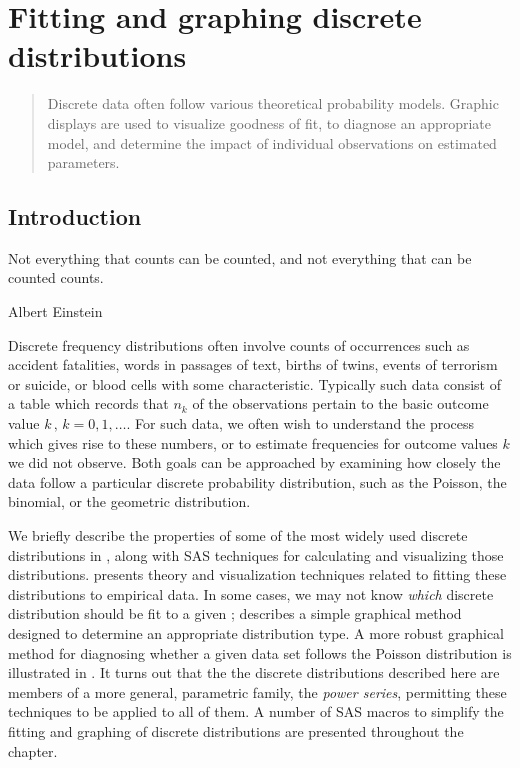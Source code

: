 \chapter{Fitting and graphing discrete distributions}\label{ch:discrete}

\begin{quote}
{\Large
Discrete data often follow various theoretical probability models.
Graphic displays are used to visualize goodness of fit,
to diagnose an appropriate model, and determine the impact of
individual observations on estimated parameters.
}
\end{quote}
\minitoc
\clearpage

\section{Introduction}
\epigraph{Not everything that counts can be counted, and not everything that
can be counted counts.}
{Albert Einstein}
Discrete frequency distributions often involve counts of occurrences
such as accident fatalities, words in passages of text,  births of twins,
events of terrorism or suicide, or blood
cells with some characteristic.  Typically such data consist of a
table which records that \(n_k\) of the observations pertain to the
basic outcome value \(k \,  , \,  k = 0 , 1, \dots\).
For such data, we often wish to understand the process which gives rise to
these numbers, or to estimate frequencies for outcome values $k$ we
did not observe.  Both goals can be approached by examining
how closely the data follow a particular discrete probability distribution, such as the Poisson, the binomial, or the geometric distribution.

We briefly describe the properties of some of the most widely used
discrete distributions in , along with
SAS techniques for calculating and visualizing those distributions.
 presents theory and visualization techniques
related to fitting these distributions to empirical data.
In some cases, we may not know \emph{which} discrete distribution
should be fit to a given \Dset;  
describes a simple graphical method designed to determine an appropriate
distribution type.
A more robust graphical method for diagnosing whether a given data
set follows the Poisson distribution is illustrated in .
It turns out that the the discrete distributions described here
are members of a more general, parametric family, the \emph{power series},
permitting these
techniques to be applied to all of them.
A number of SAS macros to simplify the fitting and graphing of discrete
distributions are presented throughout the chapter.
  
